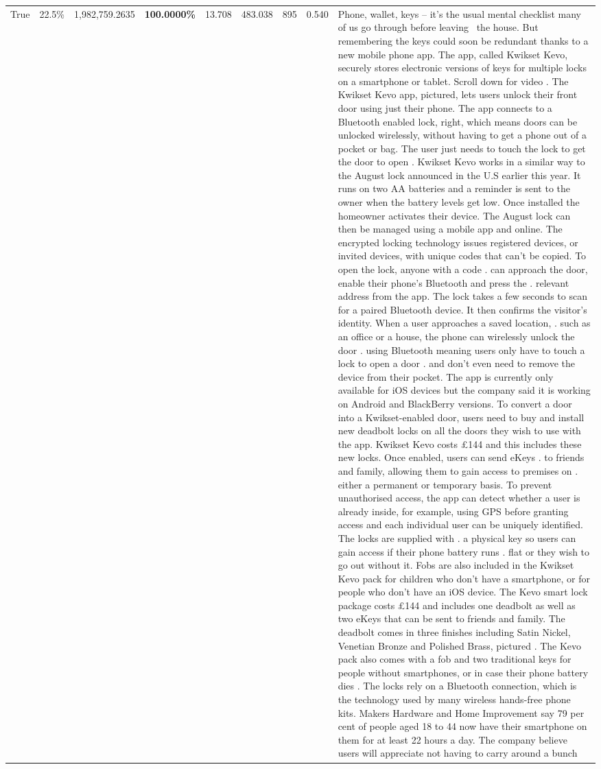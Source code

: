 \begin{table}[H]
\begin{tabular}{lllrlllll}
True & 22.5\% & 1,982,759.2635 & \bfseries \color{red} 100.0000\% & 13.708 & 483.038 & 895 & 0.540 & Phone, wallet, keys – it’s the usual mental checklist many of us go through before leaving  the house. But remembering the keys could soon be redundant thanks to a new mobile phone app. The app, called Kwikset Kevo, securely stores electronic versions of keys for multiple locks on a smartphone or tablet. Scroll down for video . The Kwikset Kevo app, pictured, lets users unlock their front door using just their phone. The app connects to a Bluetooth enabled lock, right, which means doors can be unlocked wirelessly, without having to get a phone out of a pocket or bag. The user just needs to touch the lock to get the door to open . Kwikset Kevo works in a similar way to the August lock announced in the U.S earlier this year. It runs on two AA batteries and a reminder is sent to the owner when the battery levels get low. Once installed the homeowner activates their device. The August lock can then be managed using a mobile app and online. The encrypted locking technology issues registered devices, or invited devices, with unique codes that can't be copied. To open the lock, anyone with a code . can approach the door, enable their phone's Bluetooth and press the . relevant address from the app. The lock takes a few seconds to scan for a paired Bluetooth device. It then confirms the visitor's identity. When a user approaches a saved location, . such as an office or a house, the phone can wirelessly unlock the door . using Bluetooth meaning users only have to touch a lock to open a door . and don't even need to remove the device from their pocket. The app is currently only available for iOS devices but the company said it is working on Android and BlackBerry versions. To convert a door into a Kwikset-enabled door, users need to buy and install new deadbolt locks on all the doors they wish to use with the app. Kwikset Kevo costs £144 and this includes these new locks. Once enabled, users can send eKeys . to friends and family, allowing them to gain access to premises on . either a permanent or temporary basis. To prevent unauthorised access, the app can detect whether a user is already inside, for example, using GPS before granting access and each individual user can be uniquely identified. The locks are supplied with . a physical key so users can gain access if their phone battery runs . flat or they wish to go out without it. Fobs are also included in the Kwikset Kevo pack for children who don't have a smartphone, or for people who don't have an iOS device. The Kevo smart lock package costs £144 and includes one deadbolt as well as two eKeys that can be sent to friends and family. The deadbolt comes in three finishes including Satin Nickel, Venetian Bronze and Polished Brass, pictured . The Kevo pack also comes with a fob and two traditional keys for people without smartphones, or in case their phone battery dies . The locks rely on a Bluetooth connection, which is the technology used by many wireless hands-free phone kits. Makers Hardware and Home Improvement say 79 per cent of people aged 18 to 44 now have their smartphone on them for at least 22 hours a day. The company believe users will appreciate not having to carry around a bunch 
\end{tabular}
\end{table}
